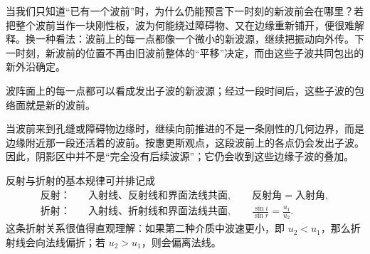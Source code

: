 当我们只知道“已有一个波前”时，为什么仍能预言下一时刻的新波前会在哪里？若把整个波前当作一块刚性板，波为何能绕过障碍物、又在边缘重新铺开，便很难解释。换一种看法：波前上的每一点都像一个微小的新波源，继续把振动向外传。下一时刻，新波前的位置不再由旧波前整体的“平移”决定，而由这些子波共同包出的新外沿确定。

\begin{theorem}[惠更斯原理]
波阵面上的每一点都可以看成发出子波的新波源；经过一段时间后，这些子波的包络面就是新的波前。
\end{theorem}

当波前来到孔缝或障碍物边缘时，继续向前推进的不是一条刚性的几何边界，而是边缘附近那一段还活着的波前。按惠更斯观点，这段波前上的各点仍会发出子波。因此，阴影区中并不是“完全没有后续波源”；它仍会收到这些边缘子波的叠加。

\begin{theorem}[波的反射和折射]
反射与折射的基本规律可并排记成
\[
\begin{aligned}
\text{反射：}\quad &\text{入射线、反射线和界面法线共面},\qquad \text{反射角}=\text{入射角},\\
\text{折射：}\quad &\text{入射线、折射线和界面法线共面},\qquad \frac{\sin i}{\sin r}=\frac{u_1}{u_2}.
\end{aligned}
\]
这条折射关系很值得直观理解：如果第二种介质中波速更小，即 \(u_2<u_1\)，那么折射线会向法线偏折；若 \(u_2>u_1\)，则会偏离法线。
\end{theorem}
